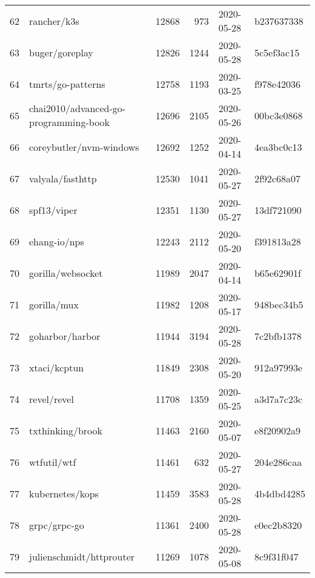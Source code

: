 \begin{longtable}{llrrll}
    62  &                                        rancher/k3s &  12868 &    973 & 2020-05-28 &  b237637338 \\
    63  &                                     buger/goreplay &  12826 &   1244 & 2020-05-28 &  5c5ef3ac15 \\
    64  &                                  tmrts/go-patterns &  12758 &   1193 & 2020-03-25 &  f978e42036 \\
    65  &              chai2010/advanced-go-programming-book &  12696 &   2105 & 2020-05-26 &  00bc3e0868 \\
    66  &                            coreybutler/nvm-windows &  12692 &   1252 & 2020-04-14 &  4ea3bc0c13 \\
    67  &                                   valyala/fasthttp &  12530 &   1041 & 2020-05-27 &  2f92c68a07 \\
    68  &                                        spf13/viper &  12351 &   1130 & 2020-05-27 &  13df721090 \\
    69  &                                       ehang-io/nps &  12243 &   2112 & 2020-05-20 &  f391813a28 \\
    70  &                                  gorilla/websocket &  11989 &   2047 & 2020-04-14 &  b65e62901f \\
    71  &                                        gorilla/mux &  11982 &   1208 & 2020-05-17 &  948bec34b5 \\
    72  &                                    goharbor/harbor &  11944 &   3194 & 2020-05-28 &  7c2bfb1378 \\
    73  &                                       xtaci/kcptun &  11849 &   2308 & 2020-05-20 &  912a97993e \\
    74  &                                        revel/revel &  11708 &   1359 & 2020-05-25 &  a3d7a7c23c \\
    75  &                                   txthinking/brook &  11463 &   2160 & 2020-05-07 &  e8f20902a9 \\
    76  &                                        wtfutil/wtf &  11461 &    632 & 2020-05-27 &  204e286caa \\
    77  &                                    kubernetes/kops &  11459 &   3583 & 2020-05-28 &  4b4dbd4285 \\
    78  &                                       grpc/grpc-go &  11361 &   2400 & 2020-05-28 &  e0ec2b8320 \\
    79  &                           julienschmidt/httprouter &  11269 &   1078 & 2020-05-08 &  8c9f31f047 \\

\end{longtable}
